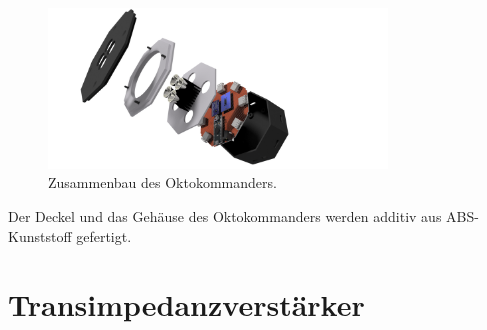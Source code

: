 \begin{figure}[h]
	\centering
	\includegraphics[width=9cm]{../CAD_Bilder/Oktokommander_raytraced.png}
	\caption{Zusammenbau des Oktokommanders.}
	\label{fig:OktoZusammenbau}
\end{figure}

Der Deckel und das Gehäuse des Oktokommanders werden additiv aus ABS-Kunststoff gefertigt.



\section{Transimpedanzverstärker}
\label{sec:Transimpedanzverstärker}

